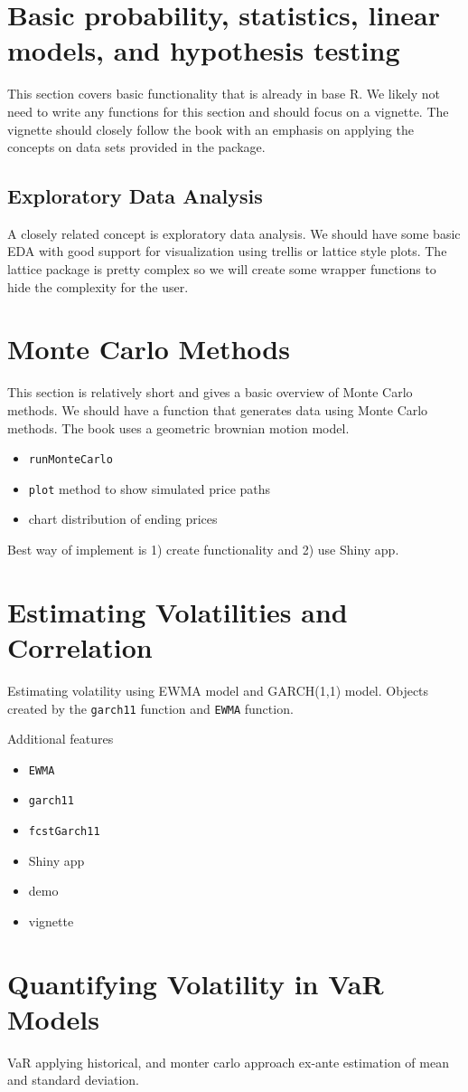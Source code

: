 \documentclass[12pt]{amsart}
\begin{document}
\section{Basic probability, statistics, linear models, and hypothesis testing}
This section covers basic functionality that is already in base R. We likely not need to write any functions for this section and should focus on a vignette. The vignette should closely follow the book with an emphasis on applying the concepts on data sets provided in the package.

\subsection{Exploratory Data Analysis}
A closely related concept is exploratory data analysis. We should have some basic EDA with good support for visualization using trellis or lattice style plots. The lattice package is pretty complex so we will create some wrapper functions to hide the complexity for the user.

\section{Monte Carlo Methods}
This section is relatively short and gives a basic overview of Monte Carlo methods. We should have a function that generates data using Monte Carlo methods. The book uses a geometric brownian motion model.

\begin{itemize}
\item \verb"runMonteCarlo"
\item \verb"plot" method to show simulated price paths
\item chart distribution of ending prices
\end{itemize}
Best way of implement is 1) create functionality and 2) use Shiny app.


\section{Estimating Volatilities and Correlation}
Estimating volatility using EWMA model and GARCH(1,1) model. Objects created by the \verb"garch11" function and \verb"EWMA" function.

Additional features
\begin{itemize}
\item \verb"EWMA"
\item \verb"garch11"
\item \verb"fcstGarch11"
\item Shiny app
\item demo
\item vignette
\end{itemize}

\section{Quantifying Volatility in VaR Models}
VaR applying historical, and monter carlo approach ex-ante estimation of mean and standard deviation.
\end{document}

